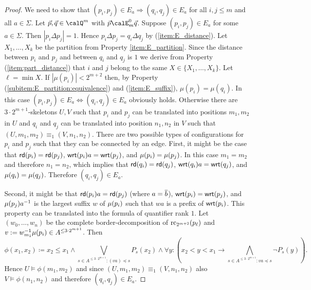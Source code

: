 \begin{proof}
	We need to show that $(p_i,p_j)\in E_a \Rightarrow (q_i,q_j)\in E_a$  for all $i,j\leq m$ and all $a\in \Sigma$.
	Let $\vec{p}, \vec{q} \in \Qx^m$ with $\vec{p} \calE^0_m \vec{q}$. Suppose  $(p_i,p_j) \in E_a$ for some $a\in\Sigma$. Then $|p_i\Delta p_j| = 1$. Hence $p_i\Delta p_j = q_i\Delta q_j$ by (\ref{item:E_distance}). 
	Let $X_1,\ldots, X_k$ be the partition from Property \ref{item:E_partition}. Since the distance between $p_i$ and $p_j$ and between $q_i$ and $q_j$ is $1$ we derive from Property (\ref{item:part_distance}) that $i$ and $j$ belong to the same 
	$X\in\{X_1,\ldots, X_k\}$. Let $\ell = \min X$.
	If $|\mu(p_i)| < 2^{m  +2}$ then, by Property (\ref{subitem:E_partition:equivalence}) and (\ref{item:E_suffix}), $\mu(p_i) = \mu(q_i)$. In this case $(p_i, p_j) \in E_a \Leftrightarrow (q_i,q_j) \in E_a$  obviously holds.
	Otherwise there are $3\cdot2^{m + 1}$-skeletons $U,V$ such that 
	$p_i$ and $p_j$ can be translated into positions $m_1, m_2$ in $U$ and $q_i$ and $q_j$ can be translated into position $n_1,n_2$ in $V$ such that $(U,m_1,m_2) \equiv_1 (V,n_1,n_2)$. 
	There are two possible types of configurations for $p_i$ and $p_j$ such that they can be connected by an edge. First, it might be the case  that $\mathsf{rd}(p_i) = \mathsf{rd}(p_j)$,
	$\mathsf{wrt}(p_i)a = \mathsf{wrt}(p_j)$, and $\mu(p_i) = \mu(p_j)$. In this case $m_1=m_2$ and therefore $n_1=n_2$, which implies that $\mathsf{rd}(q_i) = \mathsf{rd}(q_j)$,
	$\mathsf{wrt}(q_i)a = \mathsf{wrt}(q_j)$, and $\mu(q_i) = \mu(q_j)$. Therefore $(q_i,q_j) \in E_a$.
	
	Second, it might be that $\mathsf{rd}(p_i)a = \mathsf{rd}(p_j)$ (where $a=\overline{b}$),
	$\mathsf{wrt}(p_i) = \mathsf{wrt}(p_j)$, and $\mu(p_j)a^{-1}$ is the largest suffix $w$ of $\mu(p_i)$ such that $wa$ is a prefix of $\mathsf{wrt}(p_i)$.  This property can be translated into the formula of quantifier rank $1$. Let $(w_0,\ldots, w_n)$ be the complete border-decomposition of $\operatorname{rc}_{2^{m+2}}(p_\ell)$ and $v:= w_{m_1}^{-1}\mu(p_i) \in A^{\leq 3\cdot 2^{m+1}}$. Then
	\[\phi(x_1, x_2) \coloneq x_2 \leq x_1 \land \bigvee_{s\in A^{\leq 3\cdot 2^{m+1}} : (va)\preceq s} P_s(x_2) \land  \forall y: \left(x_2 < y < x_1 \to \bigwedge_{s\in A^{\leq 3\cdot 2^{m+1}} : va\preceq s} \lnot P_s(y)\right) . \]
	 Hence $U \models \phi(m_1,m_2)$  and since $(U,m_1,m_2) \equiv_1 (V, n_1,n_2)$ also $V \models \phi(n_1, n_2)$ and therefore $(q_i,q_j)\in E_a$.
\end{proof}



